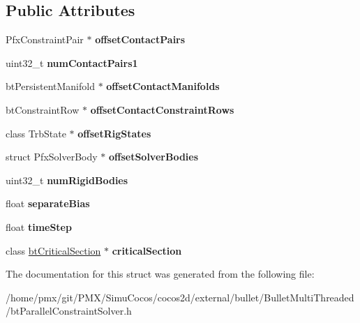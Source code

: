 \subsection*{Public Attributes}
\begin{DoxyCompactItemize}
\item 
\mbox{\label{structPfxSetupContactConstraintsIO_a2f162db153d2fb21c575da08d08c577b}} 
Pfx\+Constraint\+Pair $\ast$ {\bfseries offset\+Contact\+Pairs}
\item 
\mbox{\label{structPfxSetupContactConstraintsIO_a31699dd85f1161f33865bdff10c2f980}} 
uint32\+\_\+t {\bfseries num\+Contact\+Pairs1}
\item 
\mbox{\label{structPfxSetupContactConstraintsIO_a0aba94d7025a2c4679f7f6fe3b01cc77}} 
bt\+Persistent\+Manifold $\ast$ {\bfseries offset\+Contact\+Manifolds}
\item 
\mbox{\label{structPfxSetupContactConstraintsIO_a5ec46cb6399cda3e329cf94d522354f8}} 
bt\+Constraint\+Row $\ast$ {\bfseries offset\+Contact\+Constraint\+Rows}
\item 
\mbox{\label{structPfxSetupContactConstraintsIO_a952225845f9548cdaa8d5260dd25817a}} 
class Trb\+State $\ast$ {\bfseries offset\+Rig\+States}
\item 
\mbox{\label{structPfxSetupContactConstraintsIO_aba21b3cc706bd3f3c0f2ca680ea0d9c9}} 
struct Pfx\+Solver\+Body $\ast$ {\bfseries offset\+Solver\+Bodies}
\item 
\mbox{\label{structPfxSetupContactConstraintsIO_a62ba0c0b36ec884c15a7f86d0f8b7fb4}} 
uint32\+\_\+t {\bfseries num\+Rigid\+Bodies}
\item 
\mbox{\label{structPfxSetupContactConstraintsIO_a0f08b86e03bcc7a243db01a2f7903fa4}} 
float {\bfseries separate\+Bias}
\item 
\mbox{\label{structPfxSetupContactConstraintsIO_acf7c9c42c6ff961bf0c42c3601f4c21c}} 
float {\bfseries time\+Step}
\item 
\mbox{\label{structPfxSetupContactConstraintsIO_ab2034ff4d3b693648530a061d299391f}} 
class \hyperlink{classbtCriticalSection}{bt\+Critical\+Section} $\ast$ {\bfseries critical\+Section}
\end{DoxyCompactItemize}


The documentation for this struct was generated from the following file\+:\begin{DoxyCompactItemize}
\item 
/home/pmx/git/\+P\+M\+X/\+Simu\+Cocos/cocos2d/external/bullet/\+Bullet\+Multi\+Threaded/bt\+Parallel\+Constraint\+Solver.\+h\end{DoxyCompactItemize}
